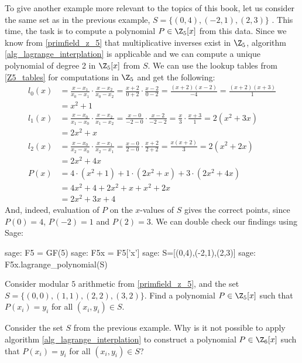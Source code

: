 \begin{example} To give another example more relevant to the topics of this book, let us consider the same set as in the previous example, $S=\{(0,4),(-2,1),(2,3)\}$ . This time, the task is to compute a polynomial $P\in\Z_5[x]$ from this data. Since we know
from \examplename{} \ref{primfield_z_5} that multiplicative inverses exist in $\Z_5$, algorithm \ref{alg_lagrange_interplation} is applicable and we can compute a unique polynomial of degree 2 in $\Z_5[x]$ from $S$. We can use the lookup tables from  \eqref{Z5_tables} for computations in $\Z_5$ and get the following:
\begin{align*}
l_0(x) & = \frac{x-x_1}{x_0-x_1}\cdot\frac{x-x_2}{x_0-x_2}
         = \frac{x+2}{0+2}\cdot\frac{x-2}{0-2}
         =  \frac{(x+2)(x-2)}{-4}
         =  \frac{(x+2)(x+3)}{1}\\
       & =  x^2+1\\
l_1(x) & =  \frac{x-x_0}{x_1-x_0}\cdot\frac{x-x_2}{x_1-x_2}
         = \frac{x-0}{-2-0}\cdot \frac{x-2}{-2-2}
         = \frac{x}{3}\cdot \frac{x+3}{1}
         = 2(x^2+3x)\\
       & =  2x^2+x\\
l_2(x) & = \frac{x-x_0}{x_2-x_0}\cdot\frac{x-x_1}{x_2-x_1}
         = \frac{x-0}{2-0}\cdot\frac{x+2}{2+2}
         = \frac{x(x+2)}{3}
         = 2(x^2+2x)\\
       & = 2x^2+4x\\
P(x)   & = 4\cdot (x^2+1) + 1\cdot (2x^2+x) + 3\cdot (2x^2+4x) \\
       & = 4x^2+4 + 2x^2 +x + x^2+2x\\
       & = 2x^2 +3x +4
\end{align*}
And, indeed, evaluation of $P$ on the $x$-values of $S$ gives the correct points, since $P(0)=4$, $P(-2)=1$ and $P(2)=3$. We can double check our findings using  Sage:
\begin{sagecommandline}sage: F5 = GF(5)
sage: F5x = F5['x']
sage: S=[(0,4),(-2,1),(2,3)]
sage: F5x.lagrange_polynomial(S)
\end{sagecommandline}
\end{example}
\begin{exercise}
Consider modular $5$ arithmetic from \examplename{} \ref{primfield_z_5}, and the set
$S=\{(0,0),(1,1),(2,2),(3,2)\}$. Find a polynomial $P\in\Z_5[x]$ such that $P(x_i)=y_i$ for all $(x_i,y_i)\in S$.
\end{exercise}
\begin{exercise}
Consider the set $S$ from the previous example. Why is it not possible to apply algorithm \ref{alg_lagrange_interplation} to construct a polynomial $P\in \Z_6[x]$  such that $P(x_i)=y_i$ for all $(x_i,y_i)\in S$?
\end{exercise}
